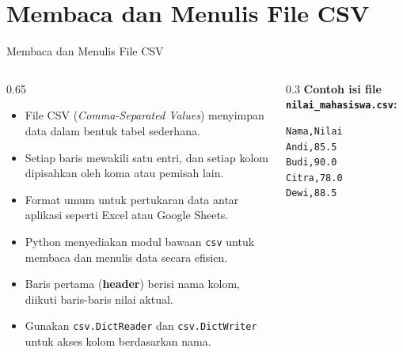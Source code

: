 \documentclass[aspectratio=169, table]{beamer}
\begin{document}
\section{Membaca dan Menulis File CSV}

\begin{frame}[fragile]{Membaca dan Menulis File CSV}
\vspace{20pt}
\begin{columns}[T, totalwidth=\textwidth]
  \begin{column}{0.65\textwidth}
  \begin{itemize}
    \item File CSV (\textit{Comma-Separated Values}) menyimpan data dalam bentuk tabel sederhana.
    \item Setiap baris mewakili satu entri, dan setiap kolom dipisahkan oleh koma atau pemisah lain.
    \item Format umum untuk pertukaran data antar aplikasi seperti Excel atau Google Sheets.
    \item Python menyediakan modul bawaan \texttt{csv} untuk membaca dan menulis data secara efisien.
    \item Baris pertama (\textbf{header}) berisi nama kolom, diikuti baris-baris nilai aktual.
    \item Gunakan \texttt{csv.DictReader} dan \texttt{csv.DictWriter} untuk akses kolom berdasarkan nama.
  \end{itemize}
  \end{column}

  \begin{column}{0.3\textwidth}
  \vspace{5pt}
  \textbf{Contoh isi file \texttt{nilai\_mahasiswa.csv}:}
  \begin{lstlisting}[language=bash, caption={Cuplikan isi file CSV}]
Nama,Nilai
Andi,85.5
Budi,90.0
Citra,78.0
Dewi,88.5
  \end{lstlisting}
  \end{column}
\end{columns}
\end{frame}
\end{document}
